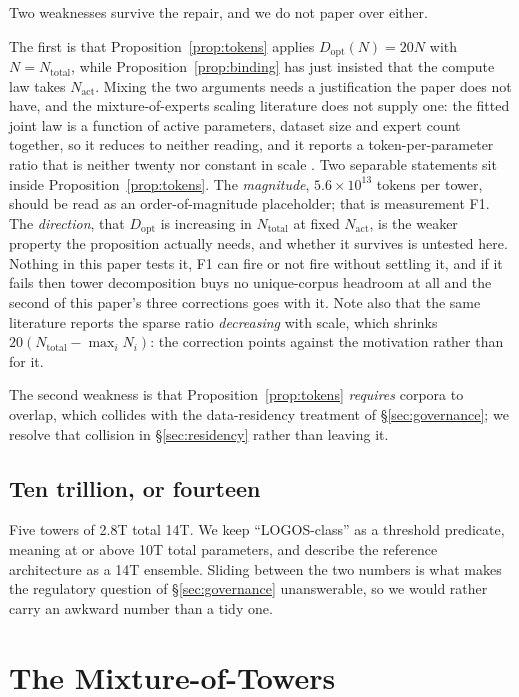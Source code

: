 \documentclass[11pt]{article}
\begin{document}
Two weaknesses survive the repair, and we do not paper over either.

The first is that Proposition~\ref{prop:tokens} applies $D_{\mathrm{opt}}(N)=20N$ with $N = N_{\mathrm{total}}$, while Proposition~\ref{prop:binding} has just insisted that the compute law takes $N_{\mathrm{act}}$. Mixing the two arguments needs a justification the paper does not have, and the mixture-of-experts scaling literature does not supply one: the fitted joint law is a function of active parameters, dataset size and expert count together, so it reduces to neither reading, and it reports a token-per-parameter ratio that is neither twenty nor constant in scale \cite{ludziejewski2025,moescaling2026}. Two separable statements sit inside Proposition~\ref{prop:tokens}. The \emph{magnitude}, $5.6\times10^{13}$ tokens per tower, should be read as an order-of-magnitude placeholder; that is measurement F1. The \emph{direction}, that $D_{\mathrm{opt}}$ is increasing in $N_{\mathrm{total}}$ at fixed $N_{\mathrm{act}}$, is the weaker property the proposition actually needs, and whether it survives is untested here. Nothing in this paper tests it, F1 can fire or not fire without settling it, and if it fails then tower decomposition buys no unique-corpus headroom at all and the second of this paper's three corrections goes with it. Note also that the same literature reports the sparse ratio \emph{decreasing} with scale, which shrinks $20(N_{\mathrm{total}} - \max_i N_i)$: the correction points against the motivation rather than for it.

The second weakness is that Proposition~\ref{prop:tokens} \emph{requires} corpora to overlap, which collides with the data-residency treatment of \S\ref{sec:governance}; we resolve that collision in \S\ref{sec:residency} rather than leaving it.

\subsection{Ten trillion, or fourteen}
\label{sec:naming}

Five towers of 2.8T total 14T. We keep ``LOGOS-class'' as a threshold predicate, meaning at or above 10T total parameters, and describe the reference architecture as a 14T ensemble. Sliding between the two numbers is what makes the regulatory question of \S\ref{sec:governance} unanswerable, so we would rather carry an awkward number than a tidy one.

\section{The Mixture-of-Towers}
\label{sec:mot}
\end{document}
